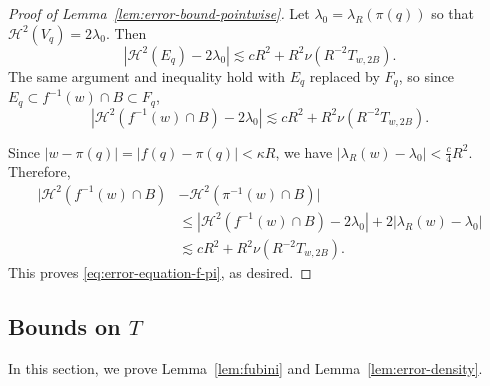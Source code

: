 \documentclass[12pt,reqno]{amsart}
\newcommand{\cH}{\mathcal{H}}
\theoremstyle{remark}
\newcommand{\0}{\mathbf{0}}
\renewcommand{\1}{\mathbf 1}
\begin{document}
\begin{proof}[Proof of Lemma~\ref{lem:error-bound-pointwise}]
  Let $\lambda_0=\lambda_R(\pi(q))$ so that $\mathcal{H}^2(V_q)=2\lambda_0$. Then
  \begin{equation}\label{eqn:Estimatee}
  |\cH^2(E_q) - 2\lambda_0| \lesssim c R^2 +  R^2 \nu(R^{-2}T_{w,2B}).
  \end{equation}
  The same argument and inequality hold with $E_q$ replaced by $F_q$, so since $E_q \subset f^{-1}(w)\cap B \subset F_q$, 
  $$|\cH^2(f^{-1}(w)\cap B) - 2\lambda_0| \lesssim cR^2 +  R^2\nu(R^{-2} T_{w,2B}).$$
  
  Since $|w-\pi(q)|=|f(q)-\pi(q)|<\kappa R$, we have $|\lambda_R(w)-\lambda_0|<\frac{c}{4}R^2$. Therefore,
  \begin{align*}
    |\cH^2(f^{-1}(w)\cap B) & - \cH^2(\pi^{-1}(w)\cap B)| \\
    & \le |\cH^2(f^{-1}(w)\cap B) - 2\lambda_0| + 2 |\lambda_R(w)-\lambda_0| \\
    & \lesssim c R^2 +  R^2\nu(R^{-2}T_{w,2B}).
  \end{align*}
  This proves \eqref{eq:error-equation-f-pi}, as desired.
\end{proof}

\subsection{Bounds on \texorpdfstring{$T$}{T}}\label{sec:proof-bounds-T}
In this section, we prove Lemma~\ref{lem:fubini} and Lemma~\ref{lem:error-density}. 
\end{document}
